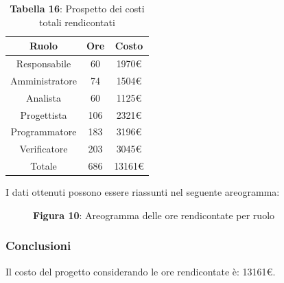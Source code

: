 \begin{table}[H]
	\centering
	\renewcommand{\arraystretch}{1.5}
	\begin{tabular}{|c|c|c|}
		\hline
		\rowcolor{lighter-grayer}
		Ruolo & Ore & Costo \\
		\hline
		Responsabile & 60 & 1970\euro \\
		\hline
		Amministratore & 74 & 1504\euro \\
		\hline
		Analista & 60 & 1125\euro \\
		\hline
		Progettista & 106 & 2321\euro \\
		\hline
		Programmatore & 183 & 3196\euro \\
		\hline
		Verificatore & 203 & 3045\euro \\
		\hline
		Totale & 686 &  13161\euro \\
		\hline
	\end{tabular}
	\caption*{\textbf{Tabella 16}: Prospetto dei costi totali rendicontati \\}
\end{table}

I dati ottenuti possono essere riassunti nel seguente areogramma:


\begin{figure}[H]
	\centering
	\caption*{\textbf{Figura 10}: Areogramma delle ore rendicontate per ruolo}
    \label{fig:Figura10}
\end{figure}

\subsubsection{Conclusioni}
Il costo del progetto considerando le ore rendicontate è: 13161\euro.